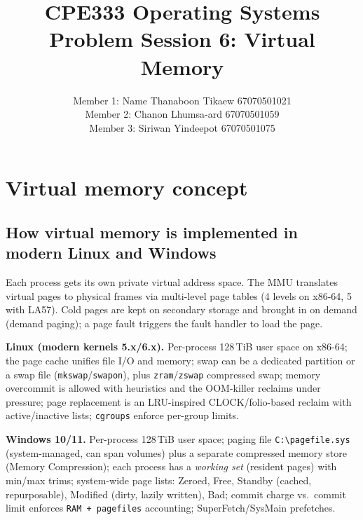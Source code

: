 \documentclass[a4paper,11pt]{article}
\title{CPE333 Operating Systems\\Problem Session 6: Virtual Memory}
\author{Member 1: Name Thanaboon Tikaew 67070501021 \\ Member 2: Chanon Lhumsa-ard 67070501059 \\ Member 3: Siriwan Yindeepot 67070501075}
\begin{document}
\maketitle
\begin{center}
\end{center}

\section{Virtual memory concept}
\subsection{How virtual memory is implemented in modern Linux and Windows}
Each process gets its own private virtual address space. The MMU translates virtual pages to physical frames via multi-level page tables (4 levels on x86-64, 5 with LA57). Cold pages are kept on secondary storage and brought in on demand (demand paging); a page fault triggers the fault handler to load the page.

\textbf{Linux (modern kernels 5.x/6.x).} Per-process 128\,TiB user space on x86-64; the page cache unifies file I/O and memory; swap can be a dedicated partition or a swap file (\texttt{mkswap}/\texttt{swapon}), plus \texttt{zram}/\texttt{zswap} compressed swap; memory overcommit is allowed with heuristics and the OOM-killer reclaims under pressure; page replacement is an LRU-inspired CLOCK/folio-based reclaim with active/inactive lists; \texttt{cgroups} enforce per-group limits.

\textbf{Windows 10/11.} Per-process 128\,TiB user space; paging file \texttt{C:\textbackslash pagefile.sys} (system-managed, can span volumes) plus a separate compressed memory store (Memory Compression); each process has a \textit{working set} (resident pages) with min/max trims; system-wide page lists: Zeroed, Free, Standby (cached, repurposable), Modified (dirty, lazily written), Bad; commit charge vs.\ commit limit enforces \texttt{RAM + pagefiles} accounting; SuperFetch/SysMain prefetches.
\end{document}

